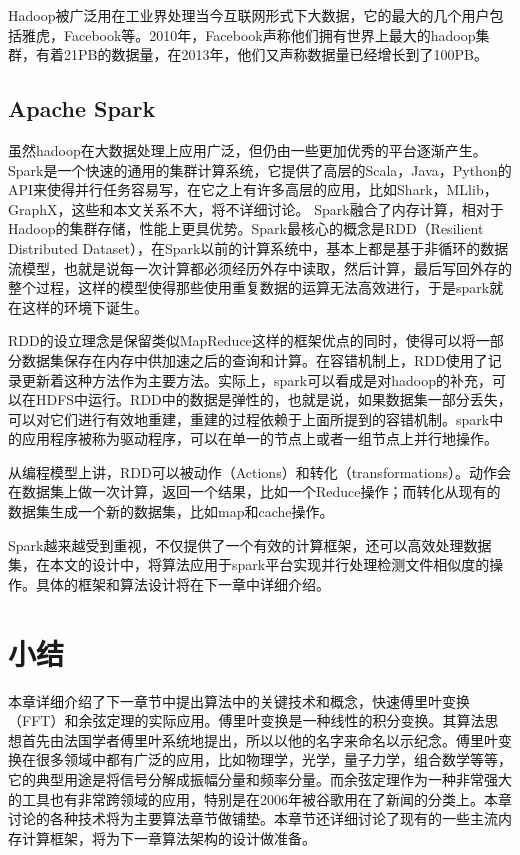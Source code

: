 Hadoop被广泛用在工业界处理当今互联网形式下大数据，它的最大的几个用户包括雅虎，Facebook等。2010年，Facebook声称他们拥有世界上最大的hadoop集群，有着21PB的数据量，在2013年，他们又声称数据量已经增长到了100PB。

\subsection{Apache Spark}
虽然hadoop在大数据处理上应用广泛，但仍由一些更加优秀的平台逐渐产生。
Spark是一个快速的通用的集群计算系统，它提供了高层的Scala，Java，Python的API来使得并行任务容易写，在它之上有许多高层的应用，比如Shark，MLlib，GraphX，这些和本文关系不大，将不详细讨论。
Spark融合了内存计算，相对于Hadoop的集群存储，性能上更具优势。Spark最核心的概念是RDD（Resilient Distributed Dataset），在Spark以前的计算系统中，基本上都是基于非循环的数据流模型，也就是说每一次计算都必须经历外存中读取，然后计算，最后写回外存的整个过程，这样的模型使得那些使用重复数据的运算无法高效进行，于是spark就在这样的环境下诞生。

RDD的设立理念是保留类似MapReduce这样的框架优点的同时，使得可以将一部分数据集保存在内存中供加速之后的查询和计算。在容错机制上，RDD使用了记录更新着这种方法作为主要方法。实际上，spark可以看成是对hadoop的补充，可以在HDFS中运行。RDD中的数据是弹性的，也就是说，如果数据集一部分丢失，可以对它们进行有效地重建，重建的过程依赖于上面所提到的容错机制。spark中的应用程序被称为驱动程序，可以在单一的节点上或者一组节点上并行地操作。

从编程模型上讲，RDD可以被动作（Actions）和转化（transformations）。动作会在数据集上做一次计算，返回一个结果，比如一个Reduce操作；而转化从现有的数据集生成一个新的数据集，比如map和cache操作。

Spark越来越受到重视，不仅提供了一个有效的计算框架，还可以高效处理数据集，在本文的设计中，将算法应用于spark平台实现并行处理检测文件相似度的操作。具体的框架和算法设计将在下一章中详细介绍。
\section{小结}
\label{sec:conc}

本章详细介绍了下一章节中提出算法中的关键技术和概念，快速傅里叶变换（FFT）和余弦定理的实际应用。傅里叶变换是一种线性的积分变换。其算法思想首先由法国学者傅里叶系统地提出，所以以他的名字来命名以示纪念。傅里叶变换在很多领域中都有广泛的应用，比如物理学，光学，量子力学，组合数学等等，它的典型用途是将信号分解成振幅分量和频率分量。而余弦定理作为一种非常强大的工具也有非常跨领域的应用，特别是在2006年被谷歌用在了新闻的分类上。本章讨论的各种技术将为主要算法章节做铺垫。本章节还详细讨论了现有的一些主流内存计算框架，将为下一章算法架构的设计做准备。
